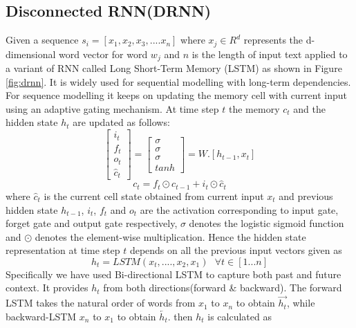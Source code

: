 \documentclass[sigconf]{acmart}
\begin{document}
\subsection{Disconnected RNN(DRNN)}\label{drnn}
Given a sequence $s_i = [x_{1}, x_{2}, x_{3},....x_{n}]$ where $x_{j} \in R^d$ represents the d-dimensional word vector for word $w_{j}$ and $n$ is the length of input text applied to a variant of RNN called Long Short-Term Memory (LSTM)\cite{hochreiter1997long} as shown in Figure \ref{fig:drnn}. It is widely used for sequential modelling with long-term dependencies.  For sequence modelling it keeps on updating the memory cell with current input using an adaptive gating mechanism. At time step $t$ the memory $c_t$ and the hidden state $h_t$ are updated as follows:
\begin{equation}
    \begin{bmatrix}
i_t\\ 
f_t\\ 
o_t\\ 
\hat{c}_t
\end{bmatrix} = \begin{bmatrix}
\sigma\\ 
\sigma\\ 
\sigma\\ 
tanh
\end{bmatrix} = W . [h_{t-1}, x_{t}]
\end{equation}
\begin{equation}
    c_t = f_t \odot c_{t-1} + i_t \odot \hat{c}_t 
\end{equation}
where $\hat{c}_t$ is the current cell state obtained from current input $x_t$ and previous hidden state $h_{t-1}$, $i_t$, $f_t$ and $o_t$ are the activation corresponding to input gate, forget gate and output gate respectively, $\sigma$ denotes the logistic sigmoid function and $\odot$ denotes the element-wise multiplication.
Hence the hidden state representation at time step $t$ depends on all the previous input vectors given as
\begin{equation}
    h_t = LSTM(x_{t}, ...., x_{2}, x_{1}) \textrm{ }\forall t\in [1...n]
    \label{shlstm}
\end{equation}
Specifically we have used Bi-directional LSTM \cite{hochreiter1997long} to capture both past and future context. It provides $h_t$ from both directions(forward \& backward). The forward LSTM takes the natural order of words from $x_{1}$ to $x_{n}$ to obtain $\overrightarrow{h_t}$, while backward-LSTM $x_{n}$ to $x_{1}$ to obtain $\overleftarrow{h_t}$. then $h_t$ is calculated as
\end{document}

